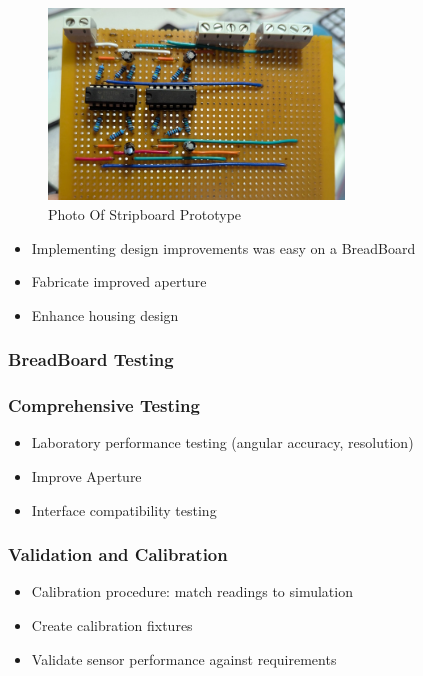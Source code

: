 %
\begin{figure}[htbp] %
  \centering
  \includegraphics[width=0.7\textwidth]{chapters/methodology/prototype/StripboardPhoto.jpg}
  \caption{Photo Of Stripboard Prototype}
  \label{fig:StripboardPhoto}
\end{figure}



\begin{itemize}
  \item Implementing design improvements was easy on a BreadBoard
  \item Fabricate improved aperture
  \item Enhance housing design
\end{itemize}


\subsubsection*{BreadBoard Testing}


\subsubsection*{Comprehensive Testing}
\begin{itemize}
  \item Laboratory performance testing (angular accuracy, resolution)
  \item Improve Aperture
  \item Interface compatibility testing
\end{itemize}

\subsubsection*{Validation and Calibration}
\begin{itemize}
  \item Calibration procedure: match readings to simulation
  \item Create calibration fixtures
  \item Validate sensor performance against requirements
\end{itemize}






